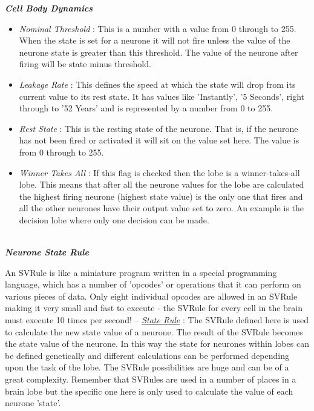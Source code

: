 \documentclass[11pt,twoside,a4paper]{article}
\begin{document}
\clearpage

\textbf{\textit{Cell Body Dynamics}}
\begin{itemize}
	\item[] \emph{Nominal Threshold} : This is a number with a value from 0 through to 255. When the state is set for a neurone it will not fire unless the value of the neurone state is greater than this threshold. The value of the neurone after firing will be state minus threshold.
	\item[] \emph{Leakage Rate} : This defines the speed at which the state will drop from its current value to its rest state. It has values like 'Instantly', '5 Seconds', right through to '52 Years' and is represented by a number from 0 to 255.
	\item[] \emph{Rest State} : This is the resting state of the neurone. That is, if the neurone has not been fired or activated it will sit on the value set here. The value is from 0 through to 255.
	\item[] \emph{Winner Takes All} : If this flag is checked then the lobe is a winner-takes-all lobe. This means that after all the neurone values for the lobe are calculated the highest firing neurone (highest state value) is the only one that fires and all the other neurones have their output value set to zero. An example is the decision lobe where only one decision can be made.
\end{itemize}~\\


\textbf{\textit{Neurone State Rule}}

An SVRule is like a miniature program written in a special programming language, which has a number of 'opcodes' or operations that it can perform on various pieces of data. Only eight individual opcodes are allowed in an SVRule making it very small and fast to execute - the SVRule for every cell in the brain must execute 10 times per second! -- \emph{\underline{State Rule}} : The SVRule defined here is used to calculate the new state value of a neurone. The result of the SVRule becomes the state value of the neurone. In this way the state for neurones within lobes can be defined genetically and different calculations can be performed depending upon the task of the lobe. The SVRule possibilities are huge and can be of a great complexity. Remember that SVRules are used in a number of places in a brain lobe but the specific one here is only used to calculate the value of each neurone 'state'.~\\ %
\end{document}
